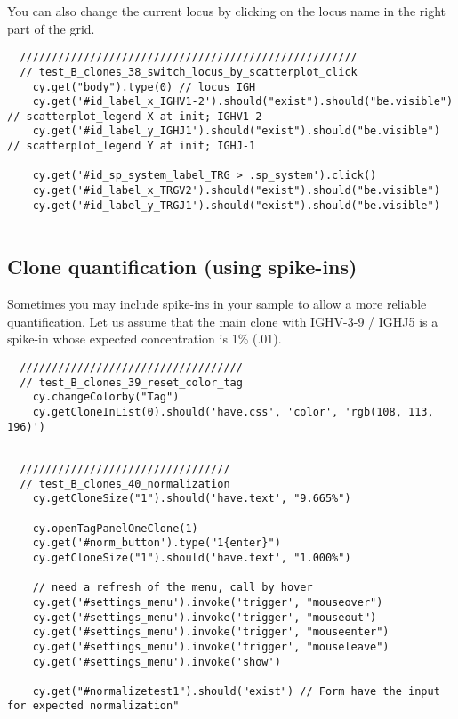 You can also change the current locus by clicking on the locus name in the
right part of the grid.
\begin{verbatim}
  /////////////////////////////////////////////////////
  // test_B_clones_38_switch_locus_by_scatterplot_click
    cy.get("body").type(0) // locus IGH
    cy.get('#id_label_x_IGHV1-2').should("exist").should("be.visible") // scatterplot_legend X at init; IGHV1-2
    cy.get('#id_label_y_IGHJ1').should("exist").should("be.visible")   // scatterplot_legend Y at init; IGHJ-1

    cy.get('#id_sp_system_label_TRG > .sp_system').click()
    cy.get('#id_label_x_TRGV2').should("exist").should("be.visible")
    cy.get('#id_label_y_TRGJ1').should("exist").should("be.visible")


\end{verbatim}

\subsection{Clone quantification (using spike-ins)}

Sometimes you may include spike-ins in your sample to allow a more reliable
quantification.
Let us assume that the main clone with IGHV-3-9 / IGHJ5 is a spike-in whose
expected concentration is 1\% (.01).

\begin{verbatim}
  ///////////////////////////////////
  // test_B_clones_39_reset_color_tag
    cy.changeColorby("Tag")
    cy.getCloneInList(0).should('have.css', 'color', 'rgb(108, 113, 196)')


\end{verbatim}

\begin{verbatim}
  /////////////////////////////////
  // test_B_clones_40_normalization
    cy.getCloneSize("1").should('have.text', "9.665%")

    cy.openTagPanelOneClone(1)
    cy.get('#norm_button').type("1{enter}")
    cy.getCloneSize("1").should('have.text', "1.000%")

    // need a refresh of the menu, call by hover
    cy.get('#settings_menu').invoke('trigger', "mouseover")
    cy.get('#settings_menu').invoke('trigger', "mouseout")
    cy.get('#settings_menu').invoke('trigger', "mouseenter")
    cy.get('#settings_menu').invoke('trigger', "mouseleave")
    cy.get('#settings_menu').invoke('show')

    cy.get("#normalizetest1").should("exist") // Form have the input for expected normalization"


\end{verbatim}

